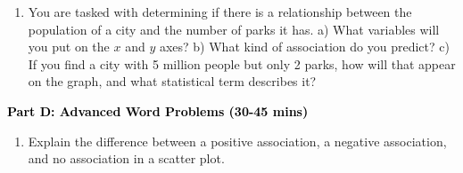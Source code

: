 \documentclass[12pt, letterpaper, fleqn]{article}
\newcommand{\blank}{\underline{\hspace{2.2cm}}}
\begin{document}
\vspace{3mm}

\begin{enumerate}[itemsep=5.5cm, leftmargin=0.6cm, resume]
\item You are tasked with determining if there is a relationship between the population of a city and the number of parks it has. 
a) What variables will you put on the $x$ and $y$ axes? 
b) What kind of association do you predict? 
c) If you find a city with 5 million people but only 2 parks, how will that appear on the graph, and what statistical term describes it?
\end{enumerate}

\newpage

\begin{tcolorbox}[colback=customteal!20]
\large\textcolor{black}{\textbf{Part D: Advanced Word Problems (30-45 mins)}}
\end{tcolorbox}

\vspace{3mm}

\begin{enumerate}[itemsep=5.5cm, leftmargin=0.6cm, resume]
\item Explain the difference between a positive association, a negative association, and no association in a scatter plot. \blank
\end{enumerate}
\end{document}
